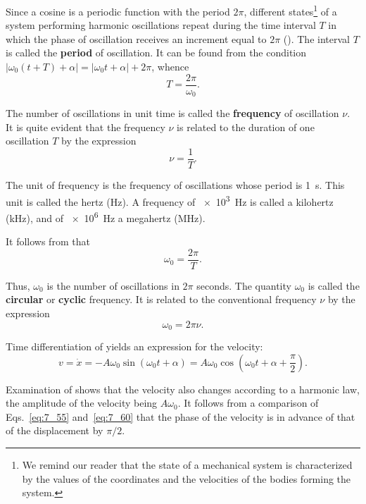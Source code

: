 Since a cosine is a periodic function with the period $2\pi$, different states\footnote{We remind our reader that the state of a mechanical system is characterized by the values of the coordinates and the velocities of the bodies forming the system.} of a system performing harmonic oscillations repeat during the time interval $T$ in which the phase of oscillation receives an increment equal to $2\pi$ (). The interval $T$ is called the \textbf{period} of oscillation. It can be found from the condition $|\omega_0(t+T)+\alpha|=|\omega_0 t+\alpha|+2\pi$, whence
\begin{equation}\label{eq:7_56}
	T = \frac{2\pi}{\omega_0}.
\end{equation}

The number of oscillations in unit time is called the \textbf{frequency} of oscillation $\nu$. It is quite evident that the frequency $\nu$ is related to the duration of one oscillation $T$ by the expression
\begin{equation}\label{eq:7_57}
	\nu = \frac{1}{T}.
\end{equation}

\noindent
The unit of frequency is the frequency of oscillations whose period is \SI{1}{\second}. This unit is called the hertz (\si{\hertz}). A frequency of \SI{e3}{\hertz} is called a kilohertz (\si{\kilo\hertz}), and of \SI{e6}{\hertz} a megahertz (\si{\mega\hertz}).

It follows from  that
\begin{equation}\label{eq:7_58}
	\omega_0 = \frac{2\pi}{T}.
\end{equation}

\noindent
Thus, $\omega_0$ is the number of oscillations in $2\pi$ seconds. The quantity $\omega_0$ is called the \textbf{circular} or \textbf{cyclic} frequency. It is related to the conventional frequency $\nu$ by the expression
\begin{equation}\label{eq:7_59}
	\omega_0 = 2\pi\nu.
\end{equation}

Time differentiation of  yields an expression for the velocity:
\begin{equation}\label{eq:7_60}
	v = \dot{x} = -A\omega_0\sin(\omega_0 t + \alpha) = A\omega_0\cos\left(\omega_0 t + \alpha + \frac{\pi}{2}\right).
\end{equation}

\noindent
Examination of  shows that the velocity also changes according to a harmonic law, the amplitude of the velocity being $A\omega_0$. It follows from a comparison of Eqs.~\eqref{eq:7_55} and~\eqref{eq:7_60} that the phase of the velocity is in advance of that of the displacement
by $\pi/2$.

